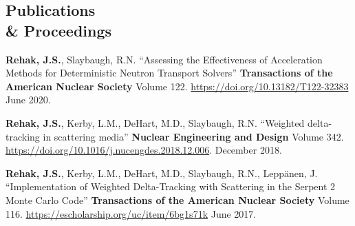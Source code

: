 \documentclass[margin,line]{resume}
\begin{document}
\begin{resume}
    \section{\mysidestyle Publications \\ \& Proceedings}
    \begin{bibsection}
    \item \textbf{Rehak, J.S.}, Slaybaugh, R.N. ``Assessing the
      Effectiveness of Acceleration Methods for Deterministic Neutron
      Transport Solvers'' \textbf{Transactions of the American Nuclear
        Society} Volume 122. \url{https://doi.org/10.13182/T122-32383} June 2020.
      \item \textbf{Rehak, J.S.}, Kerby, L.M., DeHart, M.D., Slaybaugh, R.N.
              ``Weighted delta-tracking in scattering media''
              \textbf{Nuclear Engineering and Design} Volume 342.
              \url{https://doi.org/10.1016/j.nucengdes.2018.12.006}. December 2018.
            \item \textbf{Rehak, J.S.}, Kerby, L.M., DeHart, M.D., Slaybaugh, R.N., Lepp\"{a}nen, J.
              ``Implementation of Weighted Delta-Tracking with Scattering in the Serpent 2 Monte Carlo Code''
              \textbf{Transactions of the American Nuclear Society}
              Volume
              116. \url{https://escholarship.org/uc/item/6bg1s71k} June 2017.
      \end{bibsection}
                


\end{resume}
\end{document}
